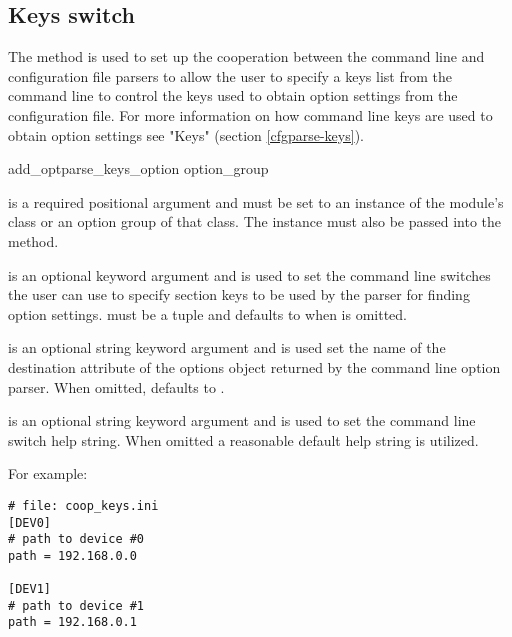 \documentclass{howto}
\begin{document}
\subsection{Keys switch\label{cfgparse-coop-keys}}
        
The  method 
is used to set up the cooperation between the command line and configuration 
file parsers to allow the user to specify a keys list from the command line
to control the keys used to obtain option settings from the configuration file.
For more information on how command line keys are used to obtain option settings
see "Keys" (section \ref{cfgparse-keys}).
 
  \begin{funcdesc}{add_optparse_keys_option}{
          option_group
          }

     is a required positional argument and must be set to 
        an instance of the  module's  
        class or an option group of that class.  The  
        instance must also be passed into the  method.
        
     is an optional keyword argument and is used to set
        the command line switches the user can use to specify section keys
        to be used by the parser for finding option settings.
         must be a tuple and defaults to
         when  is omitted.
        
     is an optional string keyword argument and is used set the 
        name of the destination attribute of the options object returned
        by the command line option parser.  When omitted,  defaults
        to .
        
     is an optional string keyword argument and is used to set
        the command line switch help string.  When omitted a reasonable 
        default help string is utilized.
  
  \end{funcdesc}

For example:

\begin{verbatim}
# file: coop_keys.ini
[DEV0]
# path to device #0
path = 192.168.0.0

[DEV1]
# path to device #1
path = 192.168.0.1
\end{verbatim}
\end{document}
